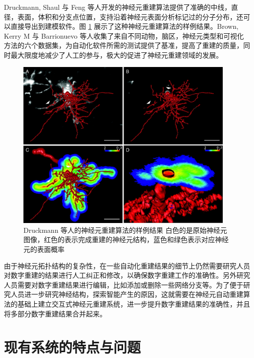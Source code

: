 Druckmann, Shaul 与 Feng 等人开发的神经元重建算法提供了准确的中线，直径，表面，体积和分支点位置，支持沿着神经元表面分析标记过的分子分布，还可以直接导出到建模软件。图 \ref{Druckmann} 展示了这种神经元重建算法的样例结果。Brown, Kerry M 与 Barrionuevo 等人收集了来自不同动物，脑区，神经元类型和可视化方法的六个数据集，为自动化软件所需的测试提供了基准，提高了重建的质量，同时最大限度地减少了人工的参与，极大的促进了神经元重建领域的发展。

\begin{figure}
\centering
\includegraphics[width=108mm]{images/Druckmann}
\caption{Druckmann 等人的神经元重建算法的样例结果 白色的是原始神经元图像，红色的表示完成重建的神经元结构，蓝色和绿色表示对应神经元的表面概率}
\label{Druckmann}
\end{figure}

由于神经元拓扑结构的复杂性，在一些自动化重建结果的细节上仍然需要研究人员对数字重建的结果进行人工纠正和修改，以确保数字重建工作的准确性。另外研究人员需要对数字重建结果进行编辑，比如添加或删除一些网络分支等。为了便于研究人员进一步研究神经结构，探索智能产生的原因，这就需要在神经元自动重建算法的基础上建立交互式神经元重建系统，进一步提升数字重建结果的准确性，并且将多部分数字重建结果合并起来。

\section{现有系统的特点与问题}
